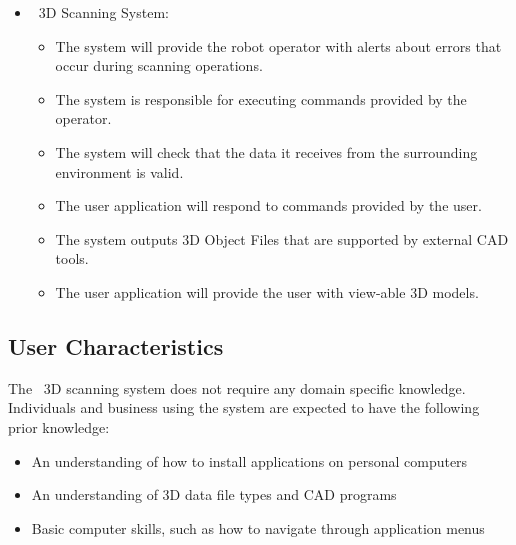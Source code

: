 \documentclass[12pt]{article}
\begin{document}
\begin{itemize}
\item \progname\ 3D Scanning System:
\begin{itemize}
\item The system will provide the robot operator with alerts about errors that occur during scanning operations.
\item The system is responsible for executing commands provided by the operator.
\item The system will check that the data it receives from the surrounding environment is valid.
\item The user application will respond to commands provided by the user.
\item The system outputs 3D Object Files that are supported by external CAD tools.
\item The user application will provide the user with view-able 3D models.
\end{itemize}
\end{itemize}

\subsection{User Characteristics} \label{SecUserCharacteristics}

  
The \progname\ 3D scanning system does not require any domain specific knowledge. Individuals and business using the system are expected to have the following prior knowledge:   
  
\begin{itemize}
\item An understanding of how to install applications on personal computers
\item An understanding of 3D data file types and CAD programs
\item Basic computer skills, such as how to navigate through application menus
\end{itemize}
\end{document}
